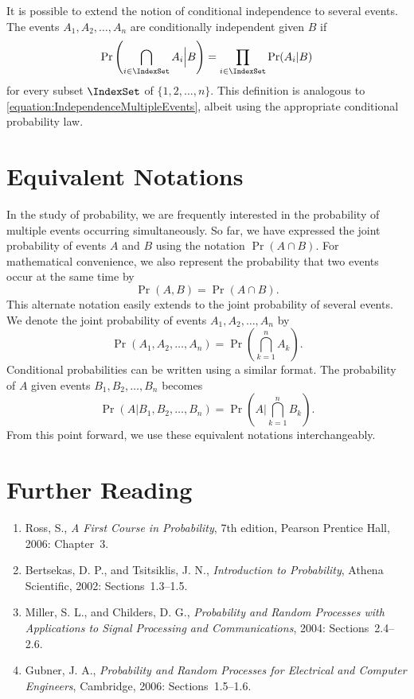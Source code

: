 It is possible to extend the notion of conditional independence to several events.
The events $A_1, A_2, \ldots, A_n$ are conditionally independent given $B$ if
\begin{equation*}
\Pr \left( \bigcap_{i \in \IndexSet} A_i \Big| B \right)
= \prod_{i \in \IndexSet} \Pr (A_i | B)
\end{equation*}
for every subset $\IndexSet$ of $\{1, 2, \ldots, n\}$.
This definition is analogous to \eqref{equation:IndependenceMultipleEvents}, albeit using the appropriate conditional probability law.


\section{Equivalent Notations}

In the study of probability, we are frequently interested in the probability of multiple events occurring simultaneously.
So far, we have expressed the joint probability of events $A$ and $B$ using the notation $\Pr (A \cap B)$.
For mathematical convenience, we also represent the probability that two events occur at the same time by
\begin{equation*}
\Pr (A, B) = \Pr (A \cap B) .
\end{equation*}
This alternate notation easily extends to the joint probability of several events.
We denote the joint probability of events $A_1, A_2, \ldots, A_n$ by
\begin{equation*}
\Pr (A_1, A_2, \ldots, A_n) =
\Pr \left( \bigcap_{k=1}^n A_k \right) .
\end{equation*}
Conditional probabilities can be written using a similar format.
The probability of $A$ given events $B_1, B_2, \ldots, B_n$ becomes
\begin{equation*}
\Pr (A | B_1, B_2, \ldots, B_n) =
\Pr \left( A \bigg| \bigcap_{k=1}^n B_k \right) .
\end{equation*}
From this point forward, we use these equivalent notations interchangeably.


\section*{Further Reading}

\begin{small}
\begin{enumerate}
\item Ross, S., \emph{A First Course in Probability}, 7th edition, Pearson Prentice Hall, 2006: Chapter~3.
\item Bertsekas, D. P., and Tsitsiklis, J. N., \emph{Introduction to Probability}, Athena Scientific, 2002: Sections~1.3--1.5.
\item Miller, S. L., and Childers, D. G., \emph{Probability and Random Processes with Applications to Signal Processing and Communications}, 2004: Sections~2.4--2.6.
\item Gubner, J. A., \emph{Probability and Random Processes for Electrical and Computer Engineers}, Cambridge, 2006: Sections~1.5--1.6.
\end{enumerate}
\end{small}

